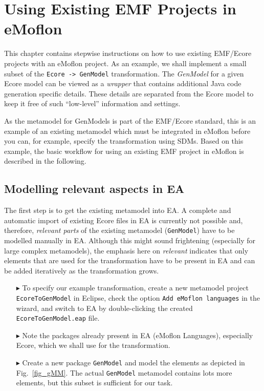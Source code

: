\section{Using Existing EMF Projects in eMoflon}
\label{sec : Ecore2GenModel}
	
This chapter contains stepwise instructions on how to use existing \mbox{EMF}/\-Ecore projects with an eMoflon project.  As an example, we shall implement a
small subset of the \texttt{Ecore -> GenModel} transformation. The \emph{GenModel} for a given Ecore model can be viewed as a \emph{wrapper} that contains
additional Java code generation specific details. These details are separated from the Ecore model to keep it free of such ``low-level'' information and
settings.

As the metamodel for \textsf{GenModels} is part of the EMF/Ecore standard, this is an example of an existing metamodel which must be integrated in eMoflon
before you can, for example, specify the transformation using SDMs.
Based on this example, the basic workflow for using an existing EMF project in eMoflon is described in the following.



\subsection{Modelling relevant aspects in EA}
\label{sec: Set Up the Example}

The first step is to get the existing metamodel into EA. A complete and automatic import of existing Ecore files in EA is currently not possible and, therefore,
\emph{relevant parts} of the existing metamodel (\texttt{GenModel}) have to be modelled manually in EA.
Although this might sound frightening (especially for large complex metamodels), the emphasis here on \emph{relevant} indicates that only elements that are used
for the transformation have to be present in EA and can be added iteratively as the transformation grows.

\begin{enumerate}
\item[$\blacktriangleright$] To specify our example transformation, create a new metamodel project \texttt{EcoreToGenModel} in Eclipse, check the option
\texttt{Add eMoflon languages} in the wizard, and switch to EA by double-clicking the created \texttt{Ecore\-To\-Gen\-Model.eap} file.

\item[$\blacktriangleright$] Note the packages already present in EA (eMoflon Languages), especially \textsf{Ecore}, which we shall use for the transformation.

\item[$\blacktriangleright$] Create a new package \texttt{GenModel} and model the elements as depicted in Fig.~\ref{fig_gMM}.
The actual \texttt{GenModel} metamodel contains lots more elements, but this subset is sufficient for our task.
\end{enumerate}

